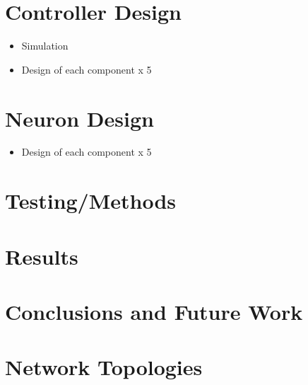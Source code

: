 \documentclass[12pt, letterpaper, oneside, onecolumn]{report} %
\begin{document}
\chapter{Controller Design}
\begin{itemize}
  \item Simulation
  \item Design of each component x 5
\end{itemize}


\chapter{Neuron Design}
\begin{itemize}
  \item Design of each component x 5
\end{itemize}


\chapter{Testing/Methods}

\chapter{Results}

\chapter{Conclusions and Future Work}


\appendix
\chapter{Network Topologies}


\printbibliography
\end{document}
